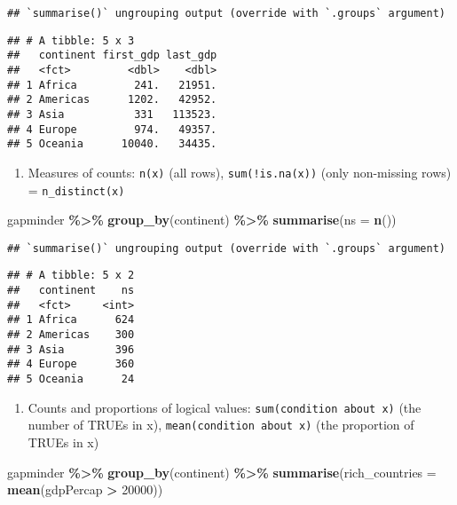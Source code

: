 \documentclass[
]{book}
\newenvironment{Shaded}{\begin{snugshade}}{\end{snugshade}}
\newcommand{\DataTypeTok}[1]{\textcolor[rgb]{0.13,0.29,0.53}{#1}}
\newcommand{\DecValTok}[1]{\textcolor[rgb]{0.00,0.00,0.81}{#1}}
\newcommand{\KeywordTok}[1]{\textcolor[rgb]{0.13,0.29,0.53}{\textbf{#1}}}
\newcommand{\NormalTok}[1]{#1}
\newcommand{\OperatorTok}[1]{\textcolor[rgb]{0.81,0.36,0.00}{\textbf{#1}}}
\newcommand{\StringTok}[1]{\textcolor[rgb]{0.31,0.60,0.02}{#1}}
\providecommand{\tightlist}{%
  \setlength{\itemsep}{0pt}\setlength{\parskip}{0pt}}
\begin{document}
\begin{verbatim}
## `summarise()` ungrouping output (override with `.groups` argument)
\end{verbatim}

\begin{verbatim}
## # A tibble: 5 x 3
##   continent first_gdp last_gdp
##   <fct>         <dbl>    <dbl>
## 1 Africa         241.   21951.
## 2 Americas      1202.   42952.
## 3 Asia           331   113523.
## 4 Europe         974.   49357.
## 5 Oceania      10040.   34435.
\end{verbatim}

\begin{enumerate}
\def\labelenumi{\arabic{enumi}.}
\setcounter{enumi}{3}
\tightlist
\item
  Measures of counts: \texttt{n(x)} (all rows), \texttt{sum(!is.na(x))} (only non-missing rows) = \texttt{n\_distinct(x)}
\end{enumerate}

\begin{Shaded}
\begin{Highlighting}[]
\NormalTok{gapminder }\OperatorTok{\%\textgreater{}\%}
\StringTok{  }\KeywordTok{group\_by}\NormalTok{(continent) }\OperatorTok{\%\textgreater{}\%}
\StringTok{  }\KeywordTok{summarise}\NormalTok{(}\DataTypeTok{ns =} \KeywordTok{n}\NormalTok{())}
\end{Highlighting}
\end{Shaded}

\begin{verbatim}
## `summarise()` ungrouping output (override with `.groups` argument)
\end{verbatim}

\begin{verbatim}
## # A tibble: 5 x 2
##   continent    ns
##   <fct>     <int>
## 1 Africa      624
## 2 Americas    300
## 3 Asia        396
## 4 Europe      360
## 5 Oceania      24
\end{verbatim}

\begin{enumerate}
\def\labelenumi{\arabic{enumi}.}
\setcounter{enumi}{4}
\tightlist
\item
  Counts and proportions of logical values: \texttt{sum(condition\ about\ x)} (the number of TRUEs in x), \texttt{mean(condition\ about\ x)} (the proportion of TRUEs in x)
\end{enumerate}

\begin{Shaded}
\begin{Highlighting}[]
\NormalTok{gapminder }\OperatorTok{\%\textgreater{}\%}
\StringTok{  }\KeywordTok{group\_by}\NormalTok{(continent) }\OperatorTok{\%\textgreater{}\%}
\StringTok{  }\KeywordTok{summarise}\NormalTok{(}\DataTypeTok{rich\_countries =} \KeywordTok{mean}\NormalTok{(gdpPercap }\OperatorTok{\textgreater{}}\StringTok{ }\DecValTok{20000}\NormalTok{))}
\end{Highlighting}
\end{Shaded}
\end{document}
